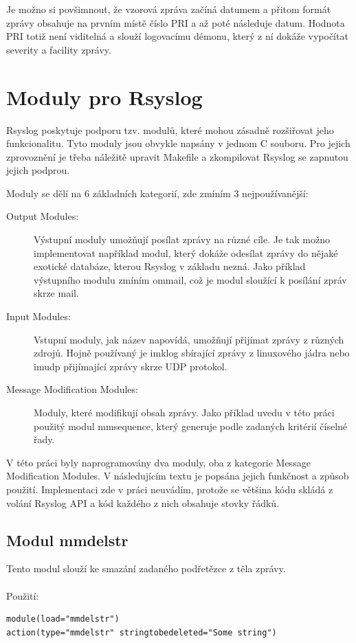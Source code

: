 \documentclass[thesis=B,czech]{FITthesis}[2012/06/26]
\begin{document}
Je možno si povšimnout, že vzorová zpráva začíná datumem a přitom formát zprávy obsahuje na prvním místě číslo PRI a až poté následuje datum. Hodnota PRI totiž není viditelná a slouží logovacímu démonu, který z ní dokáže vypočítat severity a facility zprávy.

\section{Moduly pro Rsyslog}
Rsyslog poskytuje podporu tzv. modulů, které mohou zásadně rozšiřovat jeho funkcionalitu. Tyto moduly jsou obvykle napsány v jednom C souboru. Pro jejich zprovoznění je třeba náležitě upravit Makefile a zkompilovat Rsyslog se zapnutou jejich podprou.

Moduly se dělí na 6 základních kategorií, zde zmíním 3 nejpoužívanější:

\begin{description}
  \item [Output Modules:] Výstupní moduly umožňují posílat zprávy na různé cíle. Je tak možno implementovat například modul, který dokáže odesílat zprávy do nějaké exotické databáze, kterou Rsyslog v základu nezná. Jako příklad výstupního modulu zmíním ommail, což je modul sloužící k posílání zpráv skrze mail.
  \item [Input Modules:] Vstupní moduly, jak název napovídá, umožňují přijímat zprávy z různých zdrojů. Hojně používaný je imklog sbírající zprávy z linuxového jádra nebo imudp přijímající zprávy skrze UDP protokol.
  \item [Message Modification Modules:] Moduly, které modifikují obsah zprávy. Jako příklad uvedu v této práci použitý modul mmsequence, který generuje podle zadaných kritérií číselné řady.
\end{description}

V této práci byly naprogramovány dva moduly, oba z kategorie Message Modification Modules. V následujícím textu je popsána jejich funkčnost a způsob použití. Implementaci zde v práci neuvádím, protože se většina kódu skládá z volání Rsyslog API a kód každého z nich obsahuje stovky řádků.

\subsection{Modul mmdelstr}
Tento modul slouží ke smazání zadaného podřetězce z těla zprávy.
\\
\\
Použití:
\begin{lstlisting}[style=RainerScriptSimpleStyle]
module(load="mmdelstr") 
action(type="mmdelstr" stringtobedeleted="Some string")
\end{lstlisting}
\end{document}
